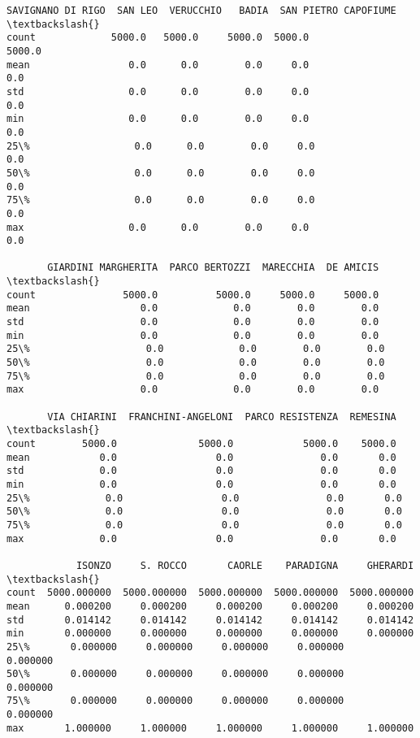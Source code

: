 \documentclass[11pt]{article}
\begin{document}
\begin{tcolorbox}[breakable, size=fbox, boxrule=.5pt, pad at break*=1mm, opacityfill=0]
\begin{Verbatim}[commandchars=\\\{\}]
       SAVIGNANO DI RIGO  SAN LEO  VERUCCHIO   BADIA  SAN PIETRO CAPOFIUME  \textbackslash{}
count             5000.0   5000.0     5000.0  5000.0                5000.0
mean                 0.0      0.0        0.0     0.0                   0.0
std                  0.0      0.0        0.0     0.0                   0.0
min                  0.0      0.0        0.0     0.0                   0.0
25\%                  0.0      0.0        0.0     0.0                   0.0
50\%                  0.0      0.0        0.0     0.0                   0.0
75\%                  0.0      0.0        0.0     0.0                   0.0
max                  0.0      0.0        0.0     0.0                   0.0

       GIARDINI MARGHERITA  PARCO BERTOZZI  MARECCHIA  DE AMICIS  \textbackslash{}
count               5000.0          5000.0     5000.0     5000.0
mean                   0.0             0.0        0.0        0.0
std                    0.0             0.0        0.0        0.0
min                    0.0             0.0        0.0        0.0
25\%                    0.0             0.0        0.0        0.0
50\%                    0.0             0.0        0.0        0.0
75\%                    0.0             0.0        0.0        0.0
max                    0.0             0.0        0.0        0.0

       VIA CHIARINI  FRANCHINI-ANGELONI  PARCO RESISTENZA  REMESINA  \textbackslash{}
count        5000.0              5000.0            5000.0    5000.0
mean            0.0                 0.0               0.0       0.0
std             0.0                 0.0               0.0       0.0
min             0.0                 0.0               0.0       0.0
25\%             0.0                 0.0               0.0       0.0
50\%             0.0                 0.0               0.0       0.0
75\%             0.0                 0.0               0.0       0.0
max             0.0                 0.0               0.0       0.0

            ISONZO     S. ROCCO       CAORLE    PARADIGNA     GHERARDI  \textbackslash{}
count  5000.000000  5000.000000  5000.000000  5000.000000  5000.000000
mean      0.000200     0.000200     0.000200     0.000200     0.000200
std       0.014142     0.014142     0.014142     0.014142     0.014142
min       0.000000     0.000000     0.000000     0.000000     0.000000
25\%       0.000000     0.000000     0.000000     0.000000     0.000000
50\%       0.000000     0.000000     0.000000     0.000000     0.000000
75\%       0.000000     0.000000     0.000000     0.000000     0.000000
max       1.000000     1.000000     1.000000     1.000000     1.000000


\end{Verbatim}
\end{tcolorbox}
\end{document}
